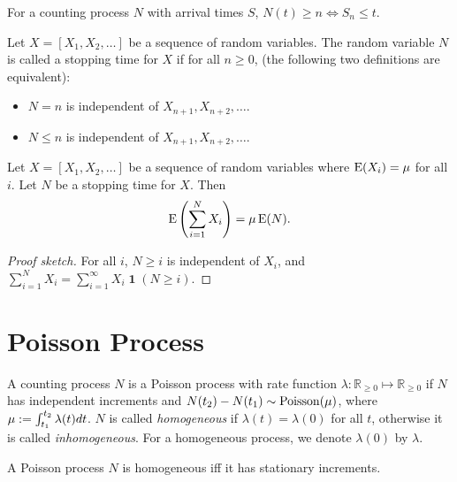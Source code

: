 \documentclass[a4paper, 12pt, fleqn]{article}
\DeclareMathOperator{\boolone}{\mathbf{1}}
\DeclareMathOperator{\Poisson}{\opname{Poisson}}
\begin{document}
\begin{lemma}
For a counting process $N$ with arrival times $S$, $N(t) \ge n \iff S_n \le t$.
\end{lemma}

\begin{definition}
\label{defn:stopping-time}
Let $X = [X_1, X_2, \ldots]$ be a sequence of random variables.
The random variable $N$ is called a stopping time for $X$ if for all $n \ge 0$,
(the following two definitions are equivalent):
\begin{itemize}
\item $N = n$ is independent of $X_{n+1}, X_{n+2}, \ldots$.
\item $N \le n$ is independent of $X_{n+1}, X_{n+2}, \ldots$.
\end{itemize}
\end{definition}

\begin{theorem}
Let $X = [X_1, X_2, \ldots]$ be a sequence of random variables where $\operatorname*{E}(X_i) = \mu$ for all $i$.
Let $N$ be a stopping time for $X$. Then
\[ \operatorname*{E}\left(\sum_{i=1}^N X_i\right) = \mu\operatorname*{E}(N). \]
\end{theorem}
\begin{proof}[Proof sketch]
For all $i$, $N \ge i$ is independent of $X_i$, and
$\displaystyle \sum_{i=1}^N X_i = \sum_{i=1}^{\infty} X_i\boolone(N \ge i)$.
\end{proof}

\section{Poisson Process}

\begin{definition}
A counting process $N$ is a Poisson process with rate function
$\lambda: \mathbb{R}_{\ge 0} \mapsto \mathbb{R}_{\ge 0}$ if
$N$ has independent increments and $N(t_2)-N(t_1) \sim \Poisson(\mu)$,
where $\mu := \int_{t_1}^{t_2} \lambda(t) dt$.
$N$ is called \emph{homogeneous} if $\lambda(t) = \lambda(0)$ for all $t$,
otherwise it is called \emph{inhomogeneous}.
For a homogeneous process, we denote $\lambda(0)$ by $\lambda$.
\end{definition}

\begin{lemma}
A Poisson process $N$ is homogeneous iff it has stationary increments.
\end{lemma}
\end{document}
